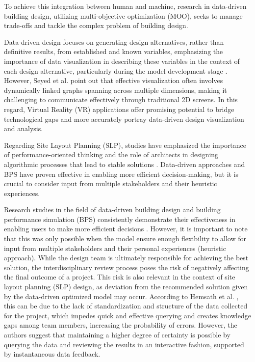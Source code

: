 To achieve this integration between human and machine, research in data-driven building design, utilizing multi-objective optimization (MOO), seeks to manage trade-offs and tackle the complex problem of building design.

Data-driven design focuses on generating design alternatives, rather than definitive results, from established and known variables, emphasizing the importance of data visualization in describing these variables in the context of each design alternative, particularly during the model development stage \cite{Burton2018}.
However, Seyed et al. \cite{Seyed2022} point out that effective visualization often involves dynamically linked graphs spanning across multiple dimensions, making it challenging to communicate effectively through traditional 2D screens. In this regard, Virtual Reality (VR) applications offer promising potential to bridge technological gaps and more accurately portray data-driven design visualization and analysis. 

Regarding Site Layout Planning (SLP), studies have emphasized the importance of performance-oriented thinking and the role of architects in designing algorithmic processes that lead to stable solutions \cite{AlSaggaf2021, Singh2019, Yang2022, Scheer2014}. Data-driven approaches and BPS have proven effective in enabling more efficient decision-making, but it is crucial to consider input from multiple stakeholders and their heuristic experiences.

Research studies in the field of data-driven building design and building performance simulation (BPS) consistently demonstrate their effectiveness in enabling users to make more efficient decisions \cite{Naboni2015}. However, it is important to note that this was only possible when the model ensure enough flexibility to allow for input from multiple stakeholders and their personal experiences (heuristic approach). While the design team is ultimately responsible for achieving the best solution, the interdisciplinary review process poses the risk of negatively affecting the final outcome of a project. This risk is also relevant in the context of site layout planning (SLP) design, as deviation from the recommended solution given by the data-driven optimized model may occur. According to Hemsath et al. \cite{Hemsath2012}, this can be due to the lack of standardization and structure of the data collected for the project, which impedes quick and effective querying and creates knowledge gaps among team members, increasing the probability of errors. However, the authors suggest that maintaining a higher degree of certainty is possible by querying the data and reviewing the results in an interactive fashion, supported by instantaneous data feedback.


